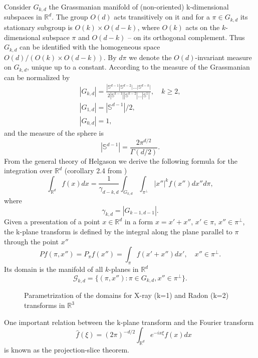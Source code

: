 \documentclass[12pt]{iopart}
\begin{document}
Consider $G_{k,d}$ the Grassmanian manifold of (non-oriented) k-dimensional subspaces in $\mathbb R^d$. The group $O(d)$ acts transitively on it and for a $\pi\in G_{k,d}$ its stationary subgroup is $O(k)\times O(d-k)$, where $O(k)$ acts on the $k$-dimensional subspace $\pi$ and $O(d-k)$ -- on its orthogonal complement. Thus $G_{k,d}$ can be identified with the homogeneous space $O(d)/(O(k)\times O(d-k))$. By $d\pi$ we denote the $O(d)$-invariant measure on $G_{k,d}$, unique up to a constant.  According to \cite{Sa} the measure of the Grassmanian can be normalized by
\begin{eqnarray*}
|G_{k,d}|=\frac{|\mathbb S^{d-1}|\mathbb S^{d-2}|\dots|\mathbb S^{d-k}|}{2|\mathbb S^{k-1}||\mathbb S^{k-2}|\dots|\mathbb S^1|},\quad k\ge2,\\
|G_{1,d}|=|\mathbb S^{d-1}|/2,\\
|G_{0,d}|=1,
\end{eqnarray*}
and the measure of the sphere is
    $$
    |\mathbb S^{d-1}|=\frac{2\pi^{d/2}}{\Gamma(d/2)}.
    $$
From the general theory of Helgason \cite{H} we derive the following formula for the integration over $\mathbb R^d$ (corollary 2.4 from \cite{K})
\begin{equation}
\label{integral}
\int_{\mathbb R^d}f(x)dx=\frac{1}{\gamma_{d-k,d}}\int_{G_{k,d}}\int_{\pi^\perp}|x''|^kf(x'')dx''d\pi,
\end{equation}
where
$$
\gamma_{k,d}=|G_{k-1,d-1}|.
$$
Given a presentation of a point $x\in\mathbb R^d$ in a form $x=x'+x''$, $x'\in\pi$, $x''\in\pi^\perp$, the k-plane transform is defined by the integral along the plane parallel to $\pi$ through the point $x''$
	$$Pf(\pi,x'')=P_\pi f(x'')=\int_{\pi}f(x'+x'')dx',\quad x''\in\pi^\perp.$$
Its domain is the manifold of all $k$-planes in $\mathbb R^d$ 
$$\mathcal G_{k,d}=\{(\pi,x''):\pi\in G_{k,d}, x''\in\pi^\perp\}.$$

\begin{figure}[h]
\caption{Parametrization of the domains for X-ray (k=1) and Radon (k=2) transforms in $\mathbb R^3$}
\label{some example}
\end{figure}
One important relation between the k-plane transform and the Fourier transform
$$\quad \widehat f(\xi)=(2\pi)^{-d/2}\int_{\mathbb R^d}e^{-ix\xi}f(x)dx$$
is  known as the projection-slice theorem. 
\end{document}
